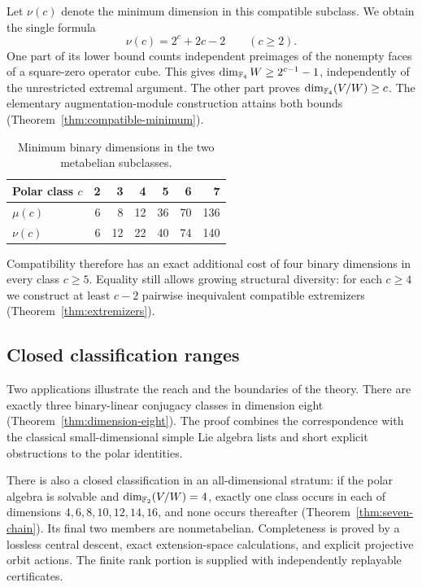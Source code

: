 Let \(\nu(c)\) denote the minimum dimension in this compatible subclass.
We obtain the single formula
\begin{equation}\label{eq:intro-compatible-minimum}
 \nu(c)=2^c+2c-2\qquad(c\ge2).
\end{equation}
One part of its lower bound counts independent preimages of the nonempty
faces of a square-zero operator cube. This gives
\(\dim_{\mathbb F_4}W\ge2^{c-1}-1\), independently of the unrestricted extremal
argument. The other part proves \(\dim_{\mathbb F_4}(V/W)\ge c\).
The elementary augmentation-module construction attains both bounds
(Theorem~\ref{thm:compatible-minimum}).

\begin{table}[ht]
\centering
\caption{Minimum binary dimensions in the two metabelian subclasses.}
\label{tab:minima}
\begin{tabular}{@{}lrrrrrr@{}}
\toprule
Polar class \(c\)&2&3&4&5&6&7\\
\midrule
\(\mu(c)\)&6&8&12&36&70&136\\
\(\nu(c)\)&6&12&22&40&74&140\\
\bottomrule
\end{tabular}
\end{table}

Compatibility therefore has an exact additional cost of four binary
dimensions in every class \(c\ge5\). Equality still allows growing
structural diversity: for each \(c\ge4\) we construct at least \(c-2\)
pairwise inequivalent compatible extremizers
(Theorem~\ref{thm:extremizers}).

\subsection{Closed classification ranges}

Two applications illustrate the reach and the boundaries of the theory.
There are exactly three binary-linear conjugacy classes in dimension eight
(Theorem~\ref{thm:dimension-eight}). The proof combines the correspondence
with the classical small-dimensional simple Lie algebra lists and short
explicit obstructions to the polar identities.

There is also a closed classification in an all-dimensional stratum:
if the polar algebra is solvable and
\(\dim_{\mathbb F_2}(V/W)=4\), exactly one class occurs in each of dimensions
\(4,6,8,10,12,14,16\), and none occurs thereafter
(Theorem~\ref{thm:seven-chain}). Its final two members are nonmetabelian.
Completeness is proved by a lossless central descent, exact extension-space
calculations, and explicit projective orbit actions. The finite rank portion
is supplied with independently replayable certificates.

